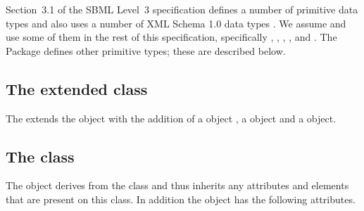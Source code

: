Section~3.1 of the SBML Level~3 specification defines a number of
primitive data types and also uses a number of XML Schema 1.0 data types
\citep{biron:2000}. We assume and use some of them in the rest of this
specification, specifically , ,
, , and . The
\SIDReferences Package defines other primitive types; these are
described below.


\subsection{The extended  class}
\label{extended-model-class}




The \SIDReferencesPackage extends the  object with the
addition of
a \ThingA object
, a \ThingB object
and a \ListOfThingCs object.

\subsection{The  class}
\label{thinga-class}




The \ThingA object derives from the \SBase class and thus inherits any
attributes and elements that are present on this class.
In addition the \ThingA object has the following attributes.

